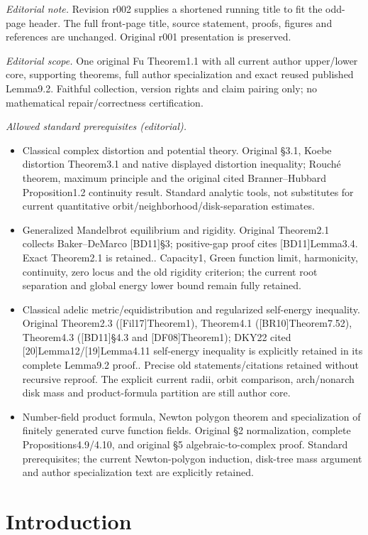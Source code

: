 \documentclass[10pt,a4paper]{amsart}
\numberwithin{equation}{section}
\theoremstyle{plain}
\theoremstyle{definition}
\theoremstyle{remark}
\begin{document}
\noindent\textit{Editorial note.} Revision r002 supplies a shortened running title to fit the odd-page header. The full front-page title, source statement, proofs, figures and references are unchanged. Original r001 presentation is preserved.\par\medskip
\noindent\textit{Editorial scope.} One original Fu Theorem1.1 with all current author upper/lower core, supporting theorems, full author specialization and exact reused published Lemma9.2. Faithful collection, version rights and claim pairing only; no mathematical repair/correctness certification.\par\medskip
\noindent\textit{Allowed standard prerequisites (editorial).}\begin{itemize}
\item Classical complex distortion and potential theory. Original §3.1, Koebe distortion Theorem3.1 and native displayed distortion inequality; Rouché theorem, maximum principle and the original cited Branner–Hubbard Proposition1.2 continuity result. Standard analytic tools, not substitutes for current quantitative orbit/neighborhood/disk-separation estimates.
\item Generalized Mandelbrot equilibrium and rigidity. Original Theorem2.1 collects Baker–DeMarco [BD11]§3; positive-gap proof cites [BD11]Lemma3.4. Exact Theorem2.1 is retained.. Capacity1, Green function limit, harmonicity, continuity, zero locus and the old rigidity criterion; the current root separation and global energy lower bound remain fully retained.
\item Classical adelic metric/equidistribution and regularized self-energy inequality. Original Theorem2.3 ([Fil17]Theorem1), Theorem4.1 ([BR10]Theorem7.52), Theorem4.3 ([BD11]§4.3 and [DF08]Theorem1); DKY22 cited [20]Lemma12/[19]Lemma4.11 self-energy inequality is explicitly retained in its complete Lemma9.2 proof.. Precise old statements/citations retained without recursive reproof. The explicit current radii, orbit comparison, arch/nonarch disk mass and product-formula partition are still author core.
\item Number-field product formula, Newton polygon theorem and specialization of finitely generated curve function fields. Original §2 normalization, complete Propositions4.9/4.10, and original §5 algebraic-to-complex proof. Standard prerequisites; the current Newton-polygon induction, disk-tree mass argument and author specialization text are explicitly retained.
\end{itemize}\medskip
\section{Introduction}\label{sec1}
\end{document}
